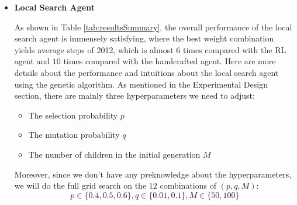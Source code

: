 \documentclass[letterpaper]{article} %
\begin{document}
\begin{itemize}
  
  \item \textbf{Local Search Agent}
  
  As shown in Table \ref{tab:resultsSummary}, the overall performance of the local search agent is immensely satisfying, where the best weight combination yields average steps of 2012, which is almost $6$ times compared with the RL agent and $10$ times compared with the handcrafted agent. Here are more details about the performance and intuitions about the local search agent using the genetic algorithm.
As mentioned in the Experimental Design section, there are mainly three hyperparameters we need to adjust:
 \begin{itemize}
 \item The selection probability $p$
 \item The mutation probability $q$
 \item The number of children in the initial generation $M$
\end{itemize}
Moreover, since we don't have any preknowledge about the hyperparameters, we will do the full grid search on the $12$ combinations of $(p, q, M)$:
 \[
 p\in\{0.4,0.5,0.6\}, q \in \{0.01, 0.1\}, M \in \{50, 100\}
 \] 
 

\end{itemize}
\end{document}
